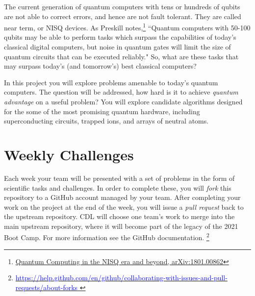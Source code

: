 \documentclass[12pt]{article}
\begin{document}
The current generation of quantum computers with tens or hundreds of qubits are not able to correct errors, and hence are not fault tolerant.
They are called near term, or NISQ devices.   As Preskill notes,\footnote{\href{https://arxiv.org/abs/1801.00862}{Quantum Computing in the NISQ era and beyond, arXiv:1801.00862}}
``Quantum computers with 50-100 qubits may 
be able to perform tasks which surpass the capabilities of today's classical digital computers, but noise in quantum gates 
will limit the size of quantum circuits that can be executed reliably."  So, what are these tasks that may surpass today's (and tomorrow's)
best classical computers?  

In this project you will explore problems amenable to today's quantum computers.  The question will be addressed, 
how hard is it to achieve {\it quantum advantage} on a useful problem?
You will explore candidate algorithms designed for the some of the most promising quantum
hardware, including superconducting circuits, trapped ions, and arrays of neutral atoms.


\section{Weekly Challenges}

Each week your team will be presented with a set of problems in the form of scientific tasks and challenges.  In order to complete these, you will {\it fork} this repository to a GitHub account managed by your team.  After completing your work on the project at the end of the week, you will issue a {\it pull request} back to the upstream repository.
CDL will choose one team's work to merge into the main upstream repository, where it will become part of the legacy of the 2021 Boot Camp.  For more information see the
GitHub documentation.
\footnote{
    \href{https://help.github.com/en/github/collaborating-with-issues-and-pull-requests/about-forks}{\textcolor{blue}{https://help.github.com/en/github/collaborating-with-issues-and-pull-requests/about-forks} } }



\newpage



\end{document}
